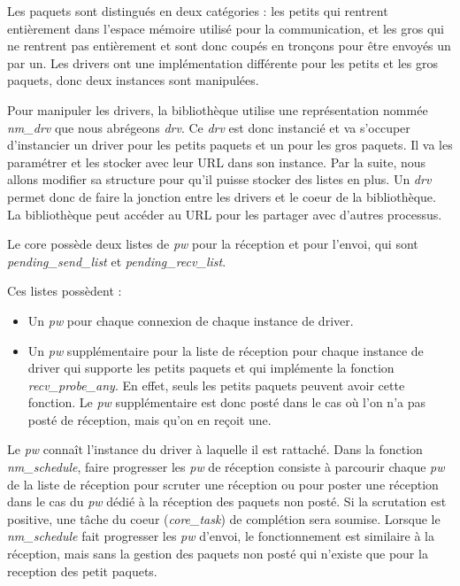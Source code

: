 Les paquets sont distingués en deux catégories :
les petits qui rentrent entièrement dans l'espace mémoire utilisé pour la communication,
et les gros qui ne rentrent pas entièrement et sont donc coupés en tronçons pour être envoyés un par un.
Les drivers ont une implémentation différente pour les petits et les gros paquets, donc deux instances sont manipulées.

Pour manipuler les drivers, la bibliothèque utilise une représentation nommée \emph{nm_drv} que nous abrégeons \emph{drv}.
Ce \emph{drv} est donc instancié et va s'occuper d'instancier un driver pour les petits paquets et un pour les gros paquets.
Il va les paramétrer et les stocker avec leur URL dans son instance.
Par la suite, nous allons modifier sa structure pour qu'il puisse stocker des listes en plus.
Un \emph{drv} permet donc de faire la jonction entre les drivers et le coeur de la bibliothèque.
La bibliothèque peut accéder au URL pour les partager avec d'autres processus.

Le core possède deux listes de \emph{pw} pour la réception et pour l'envoi,
qui sont \emph{pending_send_list} et \emph{pending_recv_list}.

Ces listes possèdent :
\begin{itemize}
  \item Un \emph{pw} pour chaque connexion de chaque instance de driver.
  \item Un \emph{pw} supplémentaire pour la liste de réception pour chaque instance de driver qui supporte les petits
  paquets et qui implémente la fonction \emph{recv_probe_any}.
  En effet, seuls les petits paquets peuvent avoir cette fonction.
  Le \emph{pw} supplémentaire est donc posté dans le cas où l'on n'a pas posté de réception, mais qu'on en reçoit une.
\end{itemize}

Le \emph{pw} connaît l'instance du driver à laquelle il est rattaché.
Dans la fonction \emph{nm_schedule}, faire progresser les \emph{pw} de réception consiste à parcourir chaque \emph{pw} de la liste
de réception pour scruter une réception ou pour poster une réception dans le cas du \emph{pw} dédié à la réception des paquets non posté.
Si la scrutation est positive, une tâche du coeur (\emph{core_task}) de complétion sera soumise.
Lorsque le \emph{nm_schedule} fait progresser les \emph{pw} d'envoi, le fonctionnement est similaire à la réception,
mais sans la gestion des paquets non posté qui n'existe que pour la reception des petit paquets.

